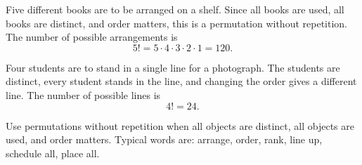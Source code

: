\begin{examplebox}
Five different books are to be arranged on a shelf. Since all books are used, all books are distinct, and order matters, this is a permutation without repetition. The number of possible arrangements is
\[
5!=5\cdot4\cdot3\cdot2\cdot1=120.
\]
\end{examplebox}

\begin{examplebox}
Four students are to stand in a single line for a photograph. The students are distinct, every student stands in the line, and changing the order gives a different line. The number of possible lines is
\[
4!=24.
\]
\end{examplebox}

\begin{remarkbox}
Use permutations without repetition when all objects are distinct, all objects are used, and order matters. Typical words are: arrange, order, rank, line up, schedule all, place all.
\end{remarkbox}
